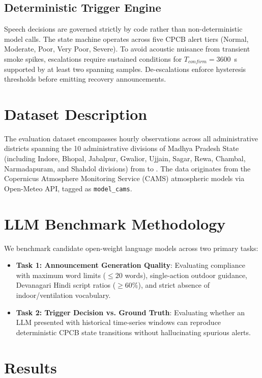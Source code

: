 \documentclass[conference]{IEEEtran}
\begin{document}
\subsection{Deterministic Trigger Engine}
Speech decisions are governed strictly by code rather than non-deterministic model calls. The state machine operates across five CPCB alert tiers (Normal, Moderate, Poor, Very Poor, Severe). To avoid acoustic nuisance from transient smoke spikes, escalations require sustained conditions for $T_{confirm} = 3600$~s supported by at least two spanning samples. De-escalations enforce hysteresis thresholds before emitting recovery announcements.

\section{Dataset Description}
The evaluation dataset encompasses \datasetRows{} hourly observations across all \datasetLocations{} administrative districts spanning the 10 administrative divisions of Madhya Pradesh State (including Indore, Bhopal, Jabalpur, Gwalior, Ujjain, Sagar, Rewa, Chambal, Narmadapuram, and Shahdol divisions) from \datasetStartDate{} to \datasetEndDate{}. The data originates from the Copernicus Atmosphere Monitoring Service (CAMS) atmospheric models via Open-Meteo API, tagged as \texttt{model\_cams}.

\section{LLM Benchmark Methodology}
We benchmark candidate open-weight language models across two primary tasks:
\begin{itemize}
    \item \textbf{Task 1: Announcement Generation Quality}: Evaluating compliance with maximum word limits ($\le 20$ words), single-action outdoor guidance, Devanagari Hindi script ratios ($\ge 60\%$), and strict absence of indoor/ventilation vocabulary.
    \item \textbf{Task 2: Trigger Decision vs. Ground Truth}: Evaluating whether an LLM presented with historical time-series windows can reproduce deterministic CPCB state transitions without hallucinating spurious alerts.
\end{itemize}

\section{Results}

\end{document}
